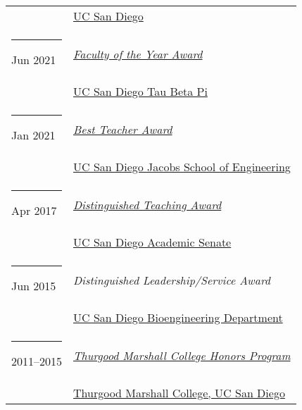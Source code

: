 \documentclass[margin,line]{res}
\begin{document}
\begin{resume}
\begin{longtable}{@{}p{0.7in}p{4in}}
\hspace*{-4mm} \hspace*{-4mm} & \hspace{4mm} \href{https://www.ucsd.edu/}{UC San Diego}\\
\hspace*{-4mm} \rule{-1mm}{5mm} Jun 2021 & \href{https://tbp.ucsd.edu/home}{\textit{Faculty of the Year Award}}\\*
\hspace*{-4mm} \hspace*{-4mm} & \hspace{4mm} \href{https://tbp.ucsd.edu/home}{UC San Diego Tau Beta Pi}\\
\hspace*{-4mm} \rule{-1mm}{5mm} Jan 2021 & \href{https://jacobsschool.ucsd.edu/faculty/best-teacher-awards}{\textit{Best Teacher Award}}\\*
\hspace*{-4mm} \hspace*{-4mm} & \hspace{4mm} \href{https://jacobsschool.ucsd.edu/}{UC San Diego Jacobs School of Engineering}\\
\hspace*{-4mm} \rule{-1mm}{5mm} Apr 2017 & \href{https://senate.ucsd.edu/grants-awards/senate-awards/distinguished-teaching-award/recipient-history}{\textit{Distinguished Teaching Award}}\\*
\hspace*{-4mm} \hspace*{-4mm} & \hspace{4mm} \href{https://senate.ucsd.edu/}{UC San Diego Academic Senate}\\
\hspace*{-4mm} \rule{-1mm}{5mm} Jun 2015 & \textit{Distinguished Leadership/Service Award}\\*
\hspace*{-4mm} \hspace*{-4mm} & \hspace{4mm} \href{http://bioengineering.ucsd.edu/}{UC San Diego Bioengineering Department}\\
\hspace*{-4mm} \rule{-1mm}{5mm} 2011--2015 & \href{https://marshall.ucsd.edu/academics/academic-opportunities/tmc-honors-program.html}{\textit{Thurgood Marshall College Honors Program}}\\*
\hspace*{-4mm} \hspace*{-4mm} & \hspace{4mm} \href{https://marshall.ucsd.edu/}{Thurgood Marshall College, UC San Diego}\\

\end{longtable}
\end{resume}
\end{document}
